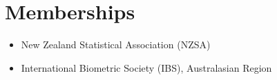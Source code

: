 \documentclass[10pt,a4paper]{moderncv}
\begin{document}



\section{Memberships}

\vspace{6pt}
\begin{itemize}
\item New Zealand Statistical Association (NZSA)
\item International Biometric Society (IBS), Australasian Region
\end{itemize}
\end{document}
